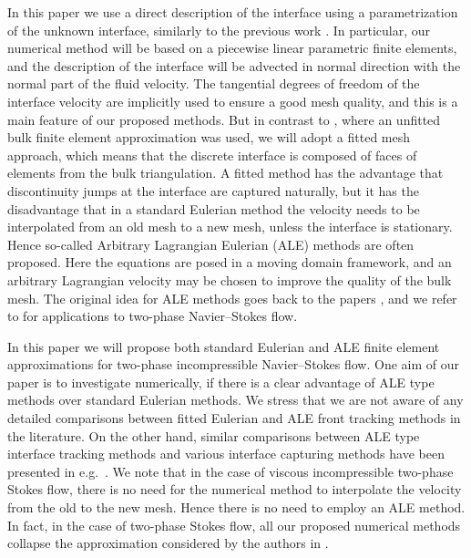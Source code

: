 \documentclass[a4paper,12pt,onecolumn]{article}
\begin{document}
In this paper we use a direct description of the interface using a
parametrization of the unknown interface, similarly to the previous work
\cite{fluidfbp}. In particular, our numerical method will be based
on a piecewise linear parametric finite elements, and the description of the
interface will be advected in normal direction
with the normal part of the fluid velocity. The tangential degrees
of freedom of the interface velocity are implicitly used to ensure a
good mesh quality, and this is a main feature of our proposed methods.
But in contrast to \cite{fluidfbp}, where an unfitted bulk finite element
approximation was used, we will adopt a fitted mesh approach, which means
that the discrete interface is composed of faces of elements from the bulk
triangulation. A fitted method has the advantage that discontinuity jumps
at the interface are captured naturally, but it has the disadvantage that in
a standard Eulerian method the velocity needs to be interpolated from
an old mesh to a new mesh, unless the interface is stationary. Hence so-called
Arbitrary Lagrangian Eulerian (ALE) methods are often proposed. Here
the equations are posed in a moving domain framework,
and an arbitrary Lagrangian velocity may be chosen to improve the quality of
the bulk mesh. The original idea for ALE methods goes back to
the papers \cite{Donea83,Hughes81}, and we refer to
\cite{Nobile99,NobilePhd,Formaggia04,Ganesan06,GanesanT08,HahnHT13,%
GanesanHST17} for applications to two-phase Navier--Stokes flow.

In this paper we will propose both standard Eulerian and
ALE finite element approximations for two-phase incompressible Navier--Stokes
flow. One aim of our paper is to investigate numerically, if there is a clear
advantage of ALE type methods over standard Eulerian methods.
We stress that we are not aware of any detailed comparisons between fitted
Eulerian and ALE front tracking methods in the literature.
On the other hand, similar
comparisons between ALE type interface tracking methods and various
interface capturing methods have been presented in e.g.\
\cite{HysingTKPBGT09,ElgetiS16}.
We note that in the case of viscous incompressible two-phase Stokes flow,
there is no need for the numerical method to interpolate the velocity from the
old to the new mesh. Hence there is no need to employ an ALE method. In fact,
in the case of two-phase Stokes flow, all our proposed numerical methods
collapse the approximation considered by the authors in \cite{stokesfitted}.
\end{document}
